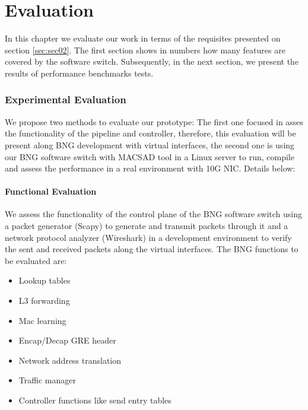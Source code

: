 \chapter{Evaluation}
\label{cap:cap05}

In this chapter we evaluate our work in terms of the requisites presented on section \ref{sec:sec02}. The first section shows in numbers how many features are covered by the software switch. Subsequently, in the next section, we present the results of performance benchmarks tests. 


\subsection{Experimental Evaluation}
We propose two methods to evaluate our prototype: The first one focused in asses the functionality of the pipeline and controller, therefore, this evaluation will be present along BNG development with virtual interfaces, the second one is using our BNG software switch with MACSAD tool in a Linux server to run, compile and assess the performance in a real environment with 10G NIC. Details below:

\subsubsection{Functional Evaluation}
We assess the functionality of the control plane of the BNG software switch using a packet generator (Scapy) to generate and transmit packets through it and a network protocol analyzer (Wireshark) in a development environment to verify the sent and received packets along the virtual interfaces. The BNG functions to be evaluated are: 

\begin{itemize}
	\item Lookup tables
	\item L3 forwarding
	\item Mac learning
	\item Encap/Decap GRE header
	\item Network address translation
	\item Traffic manager 
	\item Controller functions like send entry tables
\end{itemize}

